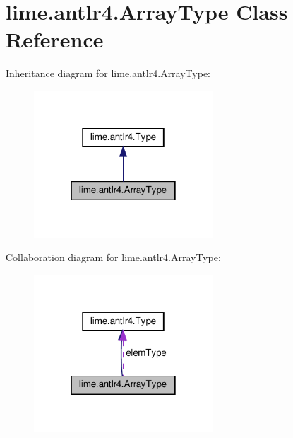 \hypertarget{classlime_1_1antlr4_1_1ArrayType}{}\section{lime.\+antlr4.\+Array\+Type Class Reference}
\label{classlime_1_1antlr4_1_1ArrayType}


Inheritance diagram for lime.\+antlr4.\+Array\+Type\+:
\nopagebreak
\begin{figure}[H]
\begin{center}
\leavevmode
\includegraphics[width=190pt]{classlime_1_1antlr4_1_1ArrayType__inherit__graph}
\end{center}
\end{figure}


Collaboration diagram for lime.\+antlr4.\+Array\+Type\+:
\nopagebreak
\begin{figure}[H]
\begin{center}
\leavevmode
\includegraphics[width=190pt]{classlime_1_1antlr4_1_1ArrayType__coll__graph}
\end{center}
\end{figure}
